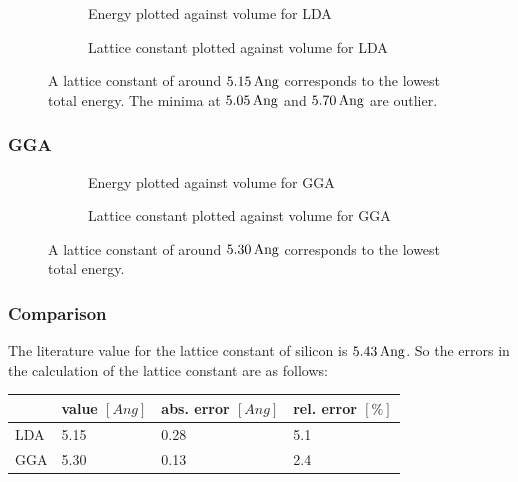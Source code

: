 \documentclass[12pt,a4paper]{scrartcl}
\begin{document}
\begin{figure}[H]
        \begin{subfigure}[a]{\textwidth}
			\resizebox{\linewidth}{!}{}
    		\caption[LDA: energy against volume]{Energy plotted against volume for LDA}
		\end{subfigure}
        \begin{subfigure}[a]{\textwidth}
			\resizebox{\linewidth}{!}{}
    		\caption[LDA: lattice constant against volume]{Lattice constant plotted against volume for LDA}
		\end{subfigure}
        \caption[Plots to determine the lowest energy lattice constant (LDA)]{A lattice constant of around $\unit[5.15]{Ang}$ corresponds to the lowest total energy. The minima at $\unit[5.05]{Ang}$ and $\unit[5.70]{Ang}$ are outlier.}
        \label{fig:latticeLDA}
\end{figure}

\subsubsection{GGA}

\begin{figure}[H]
        \begin{subfigure}[a]{\textwidth}
			\resizebox{\linewidth}{!}{}
    		\caption[GGA: energy against volume]{Energy plotted against volume for GGA}
		\end{subfigure}
        \begin{subfigure}[a]{\textwidth}
			\resizebox{\linewidth}{!}{}
    		\caption[GGA: lattice constant against volume]{Lattice constant plotted against volume for GGA}
		\end{subfigure}
        \caption[Plots to determine the lowest energy lattice constant (GGA)]{A lattice constant of around $\unit[5.30]{Ang}$ corresponds to the lowest total energy.}
        \label{fig:latticeGGA}
\end{figure}

\subsubsection{Comparison}
The literature value for the lattice constant of silicon is $\unit[5.43]{Ang}$. So the errors in the calculation of the lattice constant are as follows:

\begin{table}[H]
\begin{tabular}{l|l|l|l}
  & value $[\unit{Ang}]$ & abs. error $[\unit{Ang}]$ & rel. error $[\unit{\%}]$ \\ 
\hline
LDA & 5.15 & 0.28 & 5.1 \\ 
\hline 
GGA & 5.30 & 0.13 & 2.4 \\  
\end{tabular}
\end{table}
\end{document}
